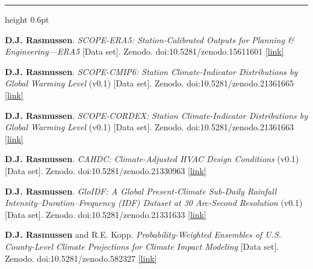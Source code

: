 \documentclass[10.5pt]{article}
\newcommand{\cvsection}[1]{%
  \par\addvspace{12pt}\pagebreak[3]%
  {\sffamily\bfseries\small\textls[80]{\MakeUppercase{#1}}}%
  \par\vspace{2pt}%
  {\color{rulegray}\hrule height 0.6pt}%
  \vspace{5pt}\nopagebreak}
\renewcommand{\section}[1]{\cvsection{#1}}
\newcommand{\yr}[1]{{\sffamily\bfseries #1}}
\begin{document}
\section{Software \& Data Products}
\begin{entries}
\item[\yr{2026}] \textbf{D.J. Rasmussen}. \emph{SCOPE-ERA5: Station-Calibrated Outputs for Planning \& Engineering---ERA5} [Data set]. Zenodo. doi:10.5281/zenodo.15611601 \href{https://doi.org/10.5281/zenodo.15611601}{[link]}
\item[\yr{2026}] \textbf{D.J. Rasmussen}. \emph{SCOPE-CMIP6: Station Climate-Indicator Distributions by Global Warming Level} (v0.1) [Data set]. Zenodo. doi:10.5281/zenodo.21361665 \href{https://doi.org/10.5281/zenodo.21361665}{[link]}
\item[\yr{2026}] \textbf{D.J. Rasmussen}. \emph{SCOPE-CORDEX: Station Climate-Indicator Distributions by Global Warming Level} (v0.1) [Data set]. Zenodo. doi:10.5281/zenodo.21361663 \href{https://doi.org/10.5281/zenodo.21361663}{[link]}
\item[\yr{2026}] \textbf{D.J. Rasmussen}. \emph{CAHDC: Climate-Adjusted HVAC Design Conditions} (v0.1) [Data set]. Zenodo. doi:10.5281/zenodo.21330963 \href{https://doi.org/10.5281/zenodo.21330963}{[link]}
\item[\yr{2026}] \textbf{D.J. Rasmussen}. \emph{GloIDF: A Global Present-Climate Sub-Daily Rainfall Intensity--Duration--Frequency (IDF) Dataset at 30 Arc-Second Resolution} (v0.1) [Data set]. Zenodo. doi:10.5281/zenodo.21331633 \href{https://doi.org/10.5281/zenodo.21331633}{[link]}
\item[\yr{2017}] \textbf{D.J. Rasmussen} and R.E. Kopp. \emph{Probability-Weighted Ensembles of U.S. County-Level Climate Projections for Climate Impact Modeling} [Data set]. Zenodo. doi:10.5281/zenodo.582327 \href{https://doi.org/10.5281/zenodo.582327}{[link]}
\end{entries}
\end{document}
